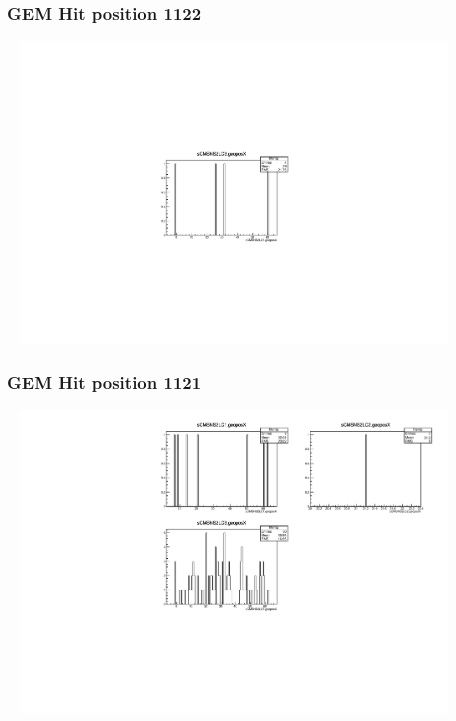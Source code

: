 \documentclass[slidestop,compress,mathserif]{beamer}
\begin{document}
\begin{frame}\frametitle{GEM Hit position 1122}
	 \includegraphics[width=12cm,height=8cm]{GEM_Hit_position_1122.pdf}
\end{frame}
\begin{frame}\frametitle{GEM Hit position 1121}
	 \includegraphics[width=12cm,height=8cm]{GEM_Hit_position_1121.pdf}
\end{frame}
\end{document}
